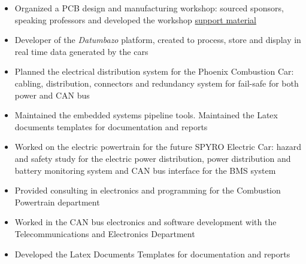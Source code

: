 \documentclass[10pt,a4paper,ragged2e,withhyper]{altacv}
\begin{document}
\begin{paracol}{2}

\begin{itemize}
  \item Organized a PCB design and manufacturing workshop: sourced sponsors, speaking professors and developed the workshop \href{https://github.com/dvcorreia/ac2-detpic-pcb-shield}{support material}
\end{itemize}

\divider

\begin{itemize}
  \item Developer of the \textit{Datumbazo} platform, created to process, store and display in real time data generated by the cars
  \item Planned the electrical distribution system for the Phoenix Combustion Car: cabling, distribution, connectors and redundancy system for fail-safe for both power and CAN bus 
  \item Maintained the embedded systems pipeline tools. Maintained the Latex documents templates for documentation and reports
\end{itemize}

\divider

\begin{itemize}
  \item Worked on the electric powertrain for the future SPYRO Electric Car: hazard and safety study for the electric power distribution, power distribution and battery monitoring system and CAN bus interface for the BMS system 
  \item Provided consulting in electronics and programming for the Combustion Powertrain department
  \item Worked in the CAN bus electronics and software development with the Telecommunications and Electronics Department
  \item Developed the Latex Documents Templates for documentation and reports
\end{itemize}


\end{paracol}
\end{document}
